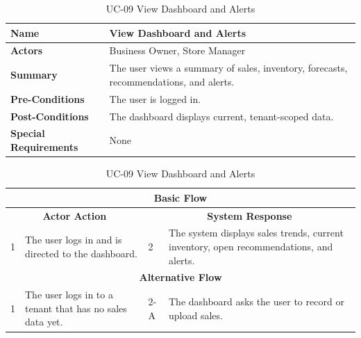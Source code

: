 \documentclass{StockSense}
\begin{document}
\begin{table}[!htbp]
\centering
\vspace*{2\baselineskip}
\caption{UC-09 View Dashboard and Alerts}
{\normalsize\linespread{1.10}\selectfont
\begin{tabular}{|p{}|p{}|}
\hline
\textbf{Name} & View Dashboard and Alerts \\ \hline
\textbf{Actors} & Business Owner, Store Manager \\ \hline
\textbf{Summary} & The user views a summary of sales, inventory, forecasts, recommendations, and alerts. \\ \hline
\textbf{Pre-Conditions} & The user is logged in. \\ \hline
\textbf{Post-Conditions} & The dashboard displays current, tenant-scoped data. \\ \hline
\textbf{Special Requirements} & None \\ \hline
\end{tabular}\par\nointerlineskip
\begin{tabular}{|p{}|p{}|p{}|p{}|}
\multicolumn{4}{|c|}{\textbf{Basic Flow}} \\ \hline
\multicolumn{2}{|c|}{\textbf{Actor Action}} & \multicolumn{2}{c|}{\textbf{System Response}} \\ \hline
1 & The user logs in and is directed to the dashboard. & 2 & The system displays sales trends, current inventory, open recommendations, and alerts. \\ \hline
\multicolumn{4}{|c|}{\textbf{Alternative Flow}} \\ \hline
1 & The user logs in to a tenant that has no sales data yet. & 2-A & The dashboard asks the user to record or upload sales. \\ \hline
\end{tabular}\par}
\end{table}
\end{document}
